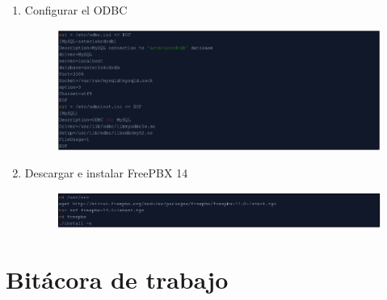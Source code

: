 \documentclass{article}
\begin{document}
\begin{enumerate}
  \item Configurar el ODBC
  \begin{figure}[!h]
    \centering
      \includegraphics[width=\columnwidth]{images/pbx-11.png}
    \label{fig:graph}
  \end{figure}
  
  \item Descargar e instalar FreePBX 14
  \begin{figure}[!h]
    \centering
      \includegraphics[width=\columnwidth]{images/pbx-12.png}
    \label{fig:graph}
  \end{figure}
\end{enumerate}


\section{Bit\'acora de trabajo}
\end{document}
